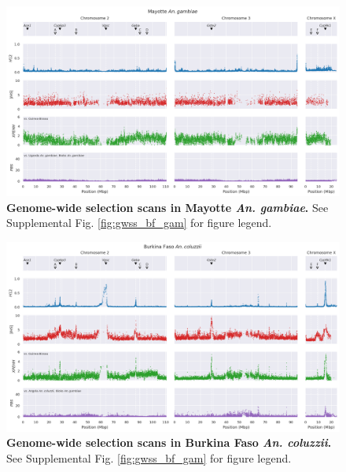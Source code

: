 \documentclass[a4paper,11pt,abstracton,hidelinks]{scrartcl}
\begin{document}
\begin{landscape}
\begin{figure}[t!]
	\begin{center}
		\includegraphics*[width=1.05\linewidth,center]{artwork/gwss_fr_gam_gw_ug_gam_gq_gam.png}
	\end{center}
	\caption[Genome-wide selection scans in Mayotte \textit{An. gambiae}]{
	\textbf{Genome-wide selection scans in Mayotte \textit{An. gambiae}.} 
	See Supplemental Fig. \ref{fig:gwss_bf_gam} for figure legend.
	} 
	\label{fig:gwss_fr_gam}
\end{figure}


\begin{figure}[t!]
	\begin{center}
		\includegraphics*[width=1.05\linewidth,center]{artwork/gwss_bf_col_gw_ao_col_gq_gam.png}
	\end{center}
	\caption[Genome-wide selection scans in Burkina Faso \textit{An. coluzzii}]{
	\textbf{Genome-wide selection scans in Burkina Faso \textit{An. coluzzii}.} 
	See Supplemental Fig. \ref{fig:gwss_bf_gam} for figure legend.
	} 
	\label{fig:gwss_bf_col}
\end{figure}



\end{landscape}
\end{document}
